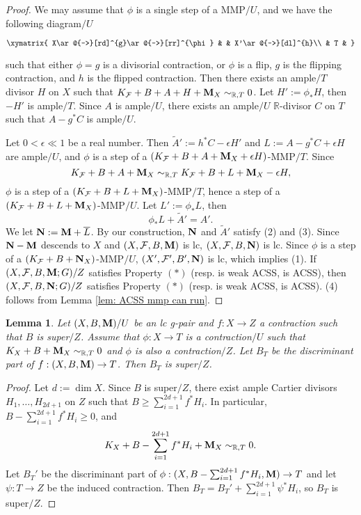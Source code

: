 \documentclass[11pt]{amsart}
\numberwithin{equation}{section}
\newcommand{\Mm}{{\bf{M}}}
\newcommand{\Nn}{{\bf{N}}}
\newcommand{\Rr}{\mathbb{R}}
\newcommand{\Ff}{\mathcal{F}}
\newtheorem{lem}[thm]{Lemma}
\theoremstyle{definition}
\theoremstyle{definition}
\theoremstyle{definition}
\begin{document}
\begin{proof}
    We may assume that $\phi$ is a single step of a MMP$/U$, and we have the following diagram$/U$
    \begin{center}$\xymatrix{
   X\ar@{->}[rd]^{g}\ar@{-->}[rr]^{\phi} & & X'\ar@{->}[dl]^{h}\\
    & T &
}$
\end{center}
such that either $\phi=g$ is a divisorial contraction, or $\phi$ is a flip, $g$ is the flipping contraction, and $h$ is the flipped contraction. Then there exists an ample$/T$ divisor $H$ on $X$ such that $K_{\Ff}+B+A+H+\Mm_X\sim_{\mathbb R,T}0$. Let $H':=\phi_*H$, then $-H'$ is ample$/T$. Since $A$ is ample$/U$, there exists an ample$/U$ $\Rr$-divisor $C$ on $T$ such that $A-g^*C$ is ample$/U$. 

Let $0<\epsilon\ll 1$ be a real number. Then $\tilde A':=h^*C-\epsilon H'$ and $L:=A-g^*C+\epsilon H$ are ample$/U$, and $\phi$ is a step of a $(K_{\Ff}+B+A+\Mm_X+\epsilon H)$-MMP$/T$. Since
$$K_{\Ff}+B+A+\Mm_X\sim_{\mathbb R,T}K_{\Ff}+B+L+\Mm_X-\epsilon H,$$
$\phi$ is a step of a $(K_{\Ff}+B+L+\Mm_X)$-MMP$/T$, hence a step of a $(K_{\Ff}+B+L+\Mm_X)$-MMP$/U$. Let $L':=\phi_*L$, then
$$\phi_*L+\tilde A'=A'.$$
We let $\Nn:=\Mm+\overline{L}$. By our construction, $\Nn$ and $\tilde A'$ satisfy (2) and (3). Since $\Nn-\Mm$ descends to $X$ and $(X,\Ff,B,\Mm)$ is lc,  $(X,\Ff,B,\Nn)$ is lc. Since $\phi$ is a step of a $(K_{\Ff}+B+\Nn_X)$-MMP$/U$, $(X',\Ff',B',\Nn)$ is lc, which implies (1). If $(X,\Ff,B,\Mm;G)/Z$ satisfies Property $(*)$ (resp. is weak ACSS, is ACSS), then $(X,\Ff,B,\Nn;G)/Z$ satisfies Property $(*)$ (resp. is weak ACSS, is ACSS). (4) follows from Lemma \ref{lem: ACSS mmp can run}.
\end{proof}

\begin{lem}\label{lem:superundercbf}
Let $(X,B,\Mm)/U$ be an lc g-pair and $f:X\to Z$ a contraction such that $B$ is super$/Z$. Assume that $\phi:X\to T$ is a contraction$/U$ such that $K_X+B+\Mm_X\sim_{\Rr,T}0$ and $\phi$ is also a contraction$/Z$. Let $B_T$ be the discriminant part of $f: (X,B,\Mm)\rightarrow T$. Then $B_T$ is super$/Z$.
\end{lem}
\begin{proof}
Let $d:=\dim X$. Since  $B$ is super$/Z$, there exist ample Cartier divisors $H_1,\dots,H_{2d+1}$ on $Z$ such that $B\geq\sum_{i=1}^{2d+1} f^*H_i$. In particular, $B-\sum_{i=1}^{2d+1} f^*H_i\ge0$, and 
$$K_X+B-\sum_{i=1}^{2d+1} f^*H_i+\Mm_X\sim_{\Rr,T}0.$$
Let $B_{T}'$ be the discriminant part of $\phi: (X,B-\sum_{i=1}^{2d+1} f^*H_i,\Mm)\rightarrow T$ and let $\psi: T\rightarrow Z$ be the induced contraction. Then $B_T=B_T'+\sum_{i=1}^{2d+1}\psi^*H_i$, so $B_T$ is super$/Z$.
\end{proof}
\end{document}
